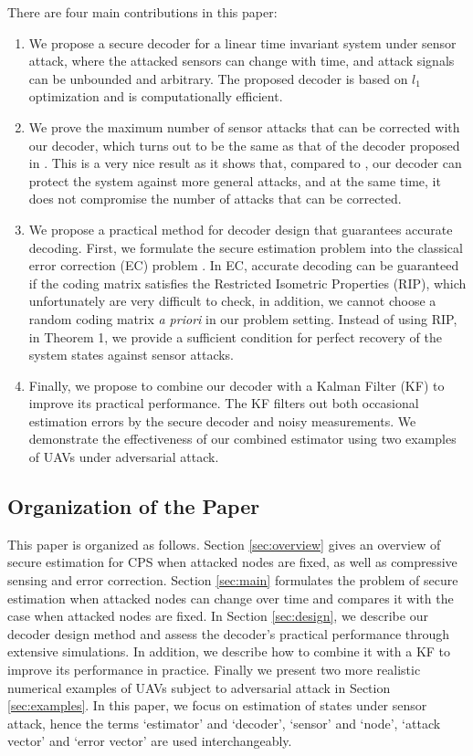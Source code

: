 \documentclass[journal]{IEEEtran}
\begin{document}
There are four main contributions in this paper:
\begin{enumerate}[listparindent=1.5em]
\item
We propose a secure decoder for a linear time invariant system under sensor attack, where the attacked sensors can change with time, and attack signals can be unbounded and arbitrary.
The proposed decoder is based on $l_1$ optimization and is computationally efficient.
\item
We prove the maximum number of sensor attacks that can be corrected with our decoder, which turns out to be the same as that of the decoder proposed in \cite{Fawzi2014}. This is a very nice result as it shows that, compared to \cite{Fawzi2014}, our decoder can protect the system against more general attacks, and at the same time, it does not compromise the number of attacks that can be corrected.
\item
We propose a practical method for decoder design that guarantees accurate decoding. 
First, we formulate the secure estimation problem into the classical error correction (EC) problem \cite{Candes_Tao}. In EC, accurate decoding can be guaranteed if the coding matrix satisfies the Restricted Isometric Properties (RIP), which unfortunately are very difficult to check, in addition, we cannot choose a random coding matrix \textit{a priori} in our problem setting. 
Instead of using RIP, in Theorem 1, we provide a sufficient condition for perfect recovery of the system states against sensor attacks.



\item
Finally, we propose to combine our decoder with a Kalman Filter (KF) to improve its practical performance. 
The KF filters out both occasional estimation errors by the secure decoder and noisy measurements.
We demonstrate the effectiveness of our combined estimator using two examples of UAVs under adversarial attack.
\end{enumerate}




\subsection{Organization of  the Paper}
This paper is organized as follows. Section \ref{sec:overview} gives an overview of secure estimation for CPS when attacked nodes are fixed, as well as compressive sensing and error correction. 
Section \ref{sec:main} formulates the problem of secure estimation when attacked nodes can change over time and compares it with the case when attacked nodes are fixed. 
In Section \ref{sec:design}, we describe our decoder design method and assess the decoder's practical performance through extensive simulations. In addition, we describe how to combine it with a KF to improve its performance in practice. Finally we present two more realistic numerical examples of UAVs subject to adversarial attack in Section \ref{sec:examples}. 
In this paper, we focus on estimation of states under sensor attack, hence the terms `estimator' and `decoder', `sensor' and `node', `attack vector' and `error vector' are used interchangeably.
 
\end{document}
